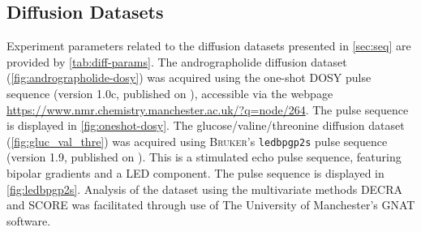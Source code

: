 \subsection{Diffusion Datasets}

Experiment parameters related to the diffusion datasets presented in
\cref{sec:seq} are provided by \cref{tab:diff-params}.
The andrographolide diffusion dataset (\cref{fig:andrographolide-dosy})
was acquired using the one-shot \ac{DOSY} pulse sequence\cite{Pelta2002}
(version 1.0c, published on ), accessible via the webpage
\url{https://www.nmr.chemistry.manchester.ac.uk/?q=node/264}. The pulse
sequence is displayed in \cref{fig:oneshot-dosy}.
The glucose/valine/threonine diffusion dataset (\cref{fig:gluc_val_thre})
was acquired using \textsc{Bruker}'s \texttt{ledbpgp2s} pulse sequence (version 1.9, published on
). This is a stimulated echo pulse sequence, featuring
bipolar gradients and a \ac{LED} component\cite{Wu1995}. The pulse sequence is
displayed in \cref{fig:ledbpgp2s}.
Analysis of the dataset using the multivariate methods \ac{DECRA} and
\ac{SCORE} was facilitated through use of The University of Manchester's
\ac{GNAT} software\cite{Castanar2018}.

